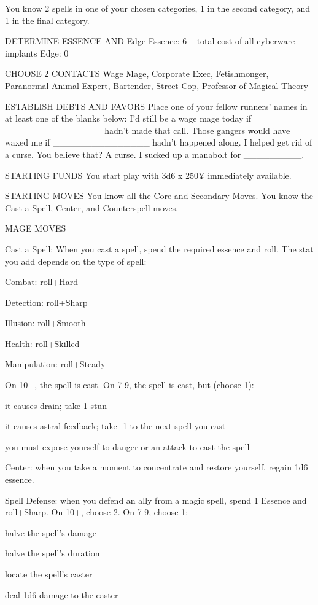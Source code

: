 You know 2 spells in one of your chosen categories, 1 in the second category, and 1 in the final category.

DETERMINE ESSENCE AND Edge
Essence: 6 – total cost of all cyberware implants
Edge: 0

CHOOSE 2 CONTACTS
Wage Mage, Corporate Exec, Fetishmonger, Paranormal Animal Expert, Bartender, Street Cop, Professor of Magical Theory

ESTABLISH DEBTS AND FAVORS
Place one of your fellow runners’ names in at least one of the blanks below:
I’d still be a wage mage today if \_\_\_\_\_\_\_\_\_\_\_\_\_\_\_ hadn’t made that call.
Those gangers would have waxed me if \_\_\_\_\_\_\_\_\_\_\_\_\_\_\_ hadn’t happened along.
I helped get rid of a curse. You believe that? A curse.
I sucked up a manabolt for \_\_\_\_\_\_\_\_\_.

STARTING FUNDS
You start play with 3d6 x 250¥ immediately available.

STARTING MOVES
You know all the Core and Secondary Moves. You know the Cast a Spell, Center, and Counterspell moves.

MAGE MOVES

Cast a Spell: When you cast a spell, spend the required essence and roll. The stat you add depends on the type of spell:

Combat: roll+Hard

Detection: roll+Sharp

Illusion: roll+Smooth

Health: roll+Skilled

Manipulation: roll+Steady

On 10+, the spell is cast. On 7-9, the spell is cast, but (choose 1):

it causes drain; take 1 stun

it causes astral feedback; take -1 to the next spell you cast

you must expose yourself to danger or an attack to cast the spell

Center: when you take a moment to concentrate and restore yourself, regain 1d6 essence.

Spell Defense: when you defend an ally from a magic spell, spend 1 Essence and roll+Sharp. On 10+, choose 2. On 7-9, choose 1:

halve the spell’s damage

halve the spell’s duration

locate the spell’s caster

deal 1d6 damage to the caster


